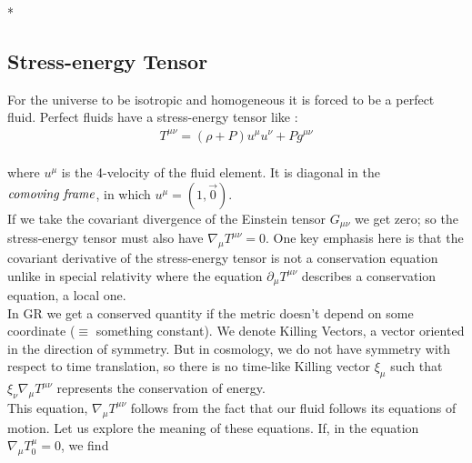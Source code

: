 *\subsection{Stress-energy Tensor}
\hspace{0.5cm}For the universe to be isotropic and homogeneous it is forced to be a perfect fluid. Perfect fluids have a stress-energy tensor like :
\begin{align}
    T^{\mu \nu } =  (\rho + P) u^{\mu } u^{\nu } + P g^{\mu \nu }\label{eq:1.19}
\end{align}\\

where $u^{\mu }$ is the 4-velocity of the fluid element. It is diagonal in the $\emph{comoving frame}$, in which $u^{\mu } = (1, \vec{0})$.\\
\hspace{0.5cm}If we take the covariant divergence of the Einstein tensor \(G_{\mu \nu }\) we get zero; so the stress-energy tensor must also have \(\nabla_{\mu} T^{\mu \nu }=0\). 
One key emphasis here is that the covariant derivative of the stress-energy tensor is not a conservation equation unlike in special relativity where the equation  \(\partial_{\mu}  T^{\mu \nu }\) describes a conservation equation, a local one.\\ 
\hspace{0.5cm}In GR we get a conserved quantity if the metric doesn't depend on some coordinate ($\equiv$ something constant). 
We denote Killing Vectors, a vector oriented in the direction of symmetry. But in cosmology, we do not have symmetry with respect to time translation, so there is no time-like Killing vector \(\xi_{\mu }\) such that \(\xi_{\nu } \nabla_{\mu } T^{\mu \nu }\) represents the conservation of energy.\\
This equation, \(\nabla_{\mu } T^{\mu \nu }\) follows from the fact that our fluid follows its equations of motion. 
Let us explore the meaning of these equations. If, in the equation \( \nabla_{\mu } T^{\mu}_{0} = 0\),  we find 
